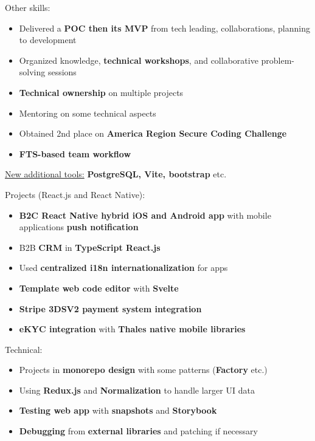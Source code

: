 \documentclass[10pt,a4paper,ragged2e,withhyper]{altacv}
\begin{document}
\medskip
Other skills:
\begin{itemize}
  \item Delivered a \textbf{POC then its MVP} from tech leading, collaborations, planning to development
  \item Organized knowledge, \textbf{technical workshops}, and collaborative problem-solving sessions
  \item \textbf{Technical ownership} on multiple projects
  \item Mentoring on some technical aspects
  \item Obtained 2nd place on \textbf{America Region Secure Coding Challenge}
  \item \textbf{FTS-based team workflow}
\end{itemize}
\begin{itshape}
  \underline{New additional tools:}
  \small{\textbf{PostgreSQL, Vite, bootstrap} etc.}
\end{itshape}

\divider

\vspace{-.5\baselineskip}
\begin{minipage}[t]{0.45\textwidth}
  \vspace{0pt}
  Projects (React.js and React Native):
  \begin{itemize}
    \item \textbf{B2C React Native hybrid iOS and Android app} with mobile applications \textbf{push notification}
    \item B2B \textbf{CRM} in \textbf{TypeScript React.js}
    \item Used \textbf{centralized i18n internationalization} for apps
    \item \textbf{Template web code editor} with \textbf{Svelte}
    \item \textbf{Stripe 3DSV2 payment system integration}
    \item \textbf{eKYC integration} with \textbf{Thales native mobile libraries}
  \end{itemize}
\end{minipage}
\hfill
\begin{minipage}[t]{0.45\textwidth}
  \vspace{0pt}
  Technical:
  \begin{itemize}
    \item Projects in \textbf{monorepo design} with some patterns (\textbf{Factory} etc.)
    \item Using \textbf{Redux.js} and \textbf{Normalization} to handle larger UI data
    \item \textbf{Testing web app} with \textbf{snapshots} and \textbf{Storybook}
    \item \textbf{Debugging} from \textbf{external libraries} and patching if necessary
  \end{itemize}
\end{minipage}
\end{document}
